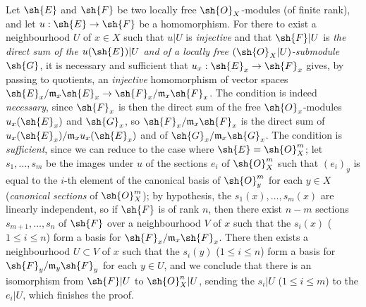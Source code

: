 \begin{env}[5.5.5]
\label{0.5.5.5}
Let $\sh{E}$ and $\sh{F}$ be two locally free $\sh{O}_X$-modules (of finite rank), and let $u:\sh{E}\to\sh{F}$ be a homomorphism.
For there to exist a neighbourhood $U$ of $x\in X$ such that $u|U$ is \emph{injective} and that $\sh{F}|U$ is \emph{the direct sum of the $u(\sh{E})|U$ and of a locally free $(\sh{O}_X|U)$-submodule $\sh{G}$}, it is necessary and sufficient that $u_x:\sh{E}_x\to\sh{F}_x$ gives, by passing to quotients, an \emph{injective} homomorphism of vector spaces $\sh{E}_x/\mathfrak{m}_x\sh{E}_x\to\sh{F}_x/\mathfrak{m}_x\sh{F}_x$.
The condition is indeed \emph{necessary}, since $\sh{F}_x$ is then the direct sum of the free $\sh{O}_x$-modules $u_x(\sh{E}_x)$ and $\sh{G}_x$, so $\sh{F}_x/\mathfrak{m}_x\sh{F}_x$ is the direct sum of $u_x(\sh{E}_x)/\mathfrak{m}_x u_x(\sh{E}_x)$ and of $\sh{G}_x/\mathfrak{m}_x\sh{G}_x$.
The condition is \emph{sufficient}, since we can reduce to the case where $\sh{E}=\sh{O}_X^m$;
let $s_1,\dots,s_m$ be the images under $u$ of the sections $e_i$ of $\sh{O}_X^m$ such that $(e_i)_y$ is equal to the $i$-th element of the canonical basis of $\sh{O}_y^m$ for each $y\in X$ (\emph{canonical sections} of $\sh{O}_X^m$);
by hypothesis, the $s_1(x),\dots,s_m(x)$ are linearly independent, so if $\sh{F}$ is of rank $n$, then there exist $n-m$ sections $s_{m+1},\dots,s_n$ of $\sh{F}$ over a neighbourhood $V$ of $x$ such that the $s_i(x)$ ($1\leq i\leq n$) form a basis for $\sh{F}_x/\mathfrak{m}_x\sh{F}_x$.
There then exists  a neighbourhood $U\subset V$ of $x$ such that the $s_i(y)$ ($1\leq i\leq n$) form a basis for $\sh{F}_y/\mathfrak{m}_y\sh{F}_y$ for each $y\in U$, and we conclude  that there is an isomorphism from $\sh{F}|U$ to $\sh{O}_X^n|U$, sending the $s_i|U$ ($1\leq i\leq m$) to the $e_i|U$, which finishes the proof.
\end{env}
